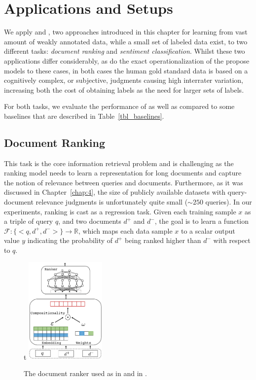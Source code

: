 \section{Applications and Setups}
We apply \cws and \fwl, two approaches introduced in this chapter for learning from vast amount of weakly annotated data, while a small set of labeled data exist, to two different tasks: \emph{document ranking} and \emph{sentiment classification}. 
Whilst these two applications differ considerably, as do the exact operationalization of the propose models to these cases, in both cases the human gold standard data is based on a cognitively complex, or subjective, judgments causing high interrater variation, increasing both the cost of obtaining labels as the need for larger sets of labels.


For both tasks, we evaluate the performance of \cws as well as \fwl compared to some baselines that are described in Table~\ref{tbl_baselines}. 

\subsection{Document Ranking}
This task is the core information retrieval problem and is challenging as the ranking model needs to learn a representation for long documents and capture the notion of relevance between queries and documents. Furthermore, as it was discussed in Chapter~\ref{chap:4}, the size of publicly available datasets with query-document relevance judgments is unfortunately quite small ($\sim 250$ queries).
%
In our experiments, ranking is cast as a regression task. Given each training sample $x$ as a triple of query $q$, and two documents $d^+$ and $d^-$, the goal is to learn a function $\mathcal{F} : \{<q, d^+, d^->\} \rightarrow \mathbb{R}$, which maps each data sample $x$ to a scalar output value $y$ indicating the probability of $d^+$ being ranked higher than $d^-$ with respect to $q$. 

\begin{figure}{t}
    \centering
            \includegraphics[width=0.35\textwidth]{03-part-02/chapter-05/figs_and_tables/fig_ranker.pdf}
    \caption{The document ranker used as \tch in \cws and \std in \fwl.}
    \label{fig:ranker}
\end{figure}


